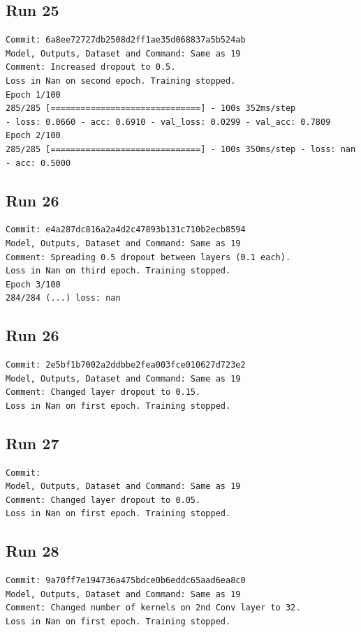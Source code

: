 \subsection{Run 25}
\begin{verbatim}
Commit: 6a8ee72727db2508d2ff1ae35d068837a5b524ab  
Model, Outputs, Dataset and Command: Same as 19
Comment: Increased dropout to 0.5.
Loss in Nan on second epoch. Training stopped.
Epoch 1/100
285/285 [==============================] - 100s 352ms/step 
- loss: 0.0660 - acc: 0.6910 - val_loss: 0.0299 - val_acc: 0.7809
Epoch 2/100
285/285 [==============================] - 100s 350ms/step - loss: nan - acc: 0.5000
\end{verbatim}

\subsection{Run 26}
\begin{verbatim}
Commit: e4a287dc816a2a4d2c47893b131c710b2ecb8594  
Model, Outputs, Dataset and Command: Same as 19
Comment: Spreading 0.5 dropout between layers (0.1 each).
Loss in Nan on third epoch. Training stopped.
Epoch 3/100
284/284 (...) loss: nan
\end{verbatim}

\subsection{Run 26}
\begin{verbatim}
Commit: 2e5bf1b7002a2ddbbe2fea003fce010627d723e2  
Model, Outputs, Dataset and Command: Same as 19
Comment: Changed layer dropout to 0.15.
Loss in Nan on first epoch. Training stopped.
\end{verbatim}

\subsection{Run 27}
\begin{verbatim}
Commit:   
Model, Outputs, Dataset and Command: Same as 19
Comment: Changed layer dropout to 0.05.
Loss in Nan on first epoch. Training stopped.
\end{verbatim}

\subsection{Run 28}
\begin{verbatim}
Commit: 9a70ff7e194736a475bdce0b6eddc65aad6ea8c0  
Model, Outputs, Dataset and Command: Same as 19
Comment: Changed number of kernels on 2nd Conv layer to 32.
Loss in Nan on first epoch. Training stopped.
\end{verbatim}

